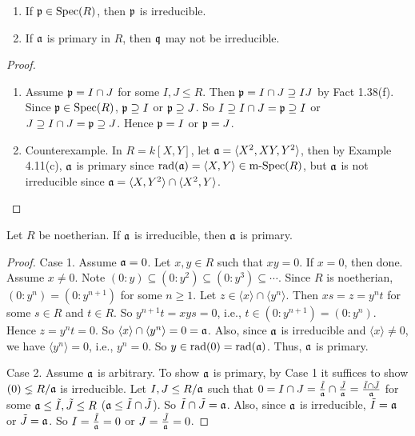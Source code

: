 \begin{example}
    \begin{enumerate}
        \item If $\mathfrak{p} \in \operatorname{Spec}(R)$, then $\mathfrak{p}$ is irreducible.
        \item If $\mathfrak{a}$ is primary in $R$, then $\mathfrak{q}$ may not be irreducible.
    \end{enumerate}
\end{example}

\begin{proof}
    \begin{enumerate}
        \item
            Assume $\mathfrak{p} = I \cap J$ for some $I,J \leq R$. Then $\mathfrak{p} = I \cap J \supseteq IJ$ by Fact 1.38(f). Since $\mathfrak{p} \in \operatorname{Spec}(R)$, $\mathfrak{p} \supseteq I$ or $\mathfrak{p} \supseteq J$. So $I \supseteq I \cap J = \mathfrak{p} \supseteq I$ or $J \supseteq I \cap J = \mathfrak{p} \supseteq J$. Hence $\mathfrak{p} = I$ or $\mathfrak{p} = J$. 
        \item 
            Counterexample. In $R = k[X,Y]$, let $\mathfrak{a} = \langle X^{2},XY,Y^{2} \rangle$, then by Example 4.11(c), $\mathfrak{a}$ is primary since $\operatorname{rad}(\mathfrak{a}) = \langle X,Y \rangle \in \operatorname{m-Spec}(R)$, but $\mathfrak{a}$ is not irreducible since $\mathfrak{a} = \langle X,Y^{2} \rangle \cap \langle X^{2},Y \rangle$. \qedhere
    \end{enumerate}
\end{proof}

\begin{proposition}
    Let $R$ be noetherian. If $\mathfrak{a}$ is irreducible, then $\mathfrak{a}$ is primary.
\end{proposition}

\begin{proof}
    Case 1. Assume $\mathfrak{a} = 0$. Let $x,y \in R$ such that $xy = 0$. If $x = 0$, then done. Assume $x \neq 0$. Note $(0:y) \subseteq (0:y^{2}) \subseteq (0:y^{3}) \subseteq \cdots$. Since $R$ is noetherian, $(0:y^{n}) = (0:y^{n+1})$ for some $n \geq 1$. Let $z \in \langle x \rangle \cap \langle y^{n} \rangle$. Then $xs = z = y^{n}t$ for some $s \in R$ and $t \in R$. So $y^{n+1}t = xys = 0$, i.e., $t \in (0:y^{n+1}) = (0:y^{n})$. Hence $z = y^{n}t = 0$. So $\langle x \rangle \cap \langle y^{n} \rangle = 0 = \mathfrak{a}$. Also, since $\mathfrak{a}$ is irreducible and $\langle x \rangle \neq 0$, we have $\langle y^{n} \rangle = 0$, i.e., $y^{n} = 0$. So $y \in \operatorname{rad}(0) = \operatorname{rad}(\mathfrak{a})$. Thus, $\mathfrak{a}$ is primary. \par 
    Case 2. Assume $\mathfrak{a}$ is arbitrary. To show $\mathfrak{a}$ is primary, by Case 1 it suffices to show $(0) \lneq R/\mathfrak{a}$ is irreducible. Let $I,J \leq R/\mathfrak{a}$ such that $0 = I \cap J = \frac{\tilde I}{\mathfrak{a}} \cap \frac{\tilde J}{\mathfrak{a}} = \frac{\tilde I \cap \tilde J}{\mathfrak{a}}$ for some $\mathfrak{a} \leq \tilde I,\tilde J \leq R$ ($\mathfrak{a} \leq \tilde I \cap \tilde J$). So $\tilde I \cap \tilde J = \mathfrak{a}$. Also, since $\mathfrak{a}$ is irreducible, $\tilde I = \mathfrak{a}$ or $\tilde J = \mathfrak{a}$. So $I = \frac{\tilde I}{\mathfrak{a}} = 0$ or $J = \frac{\tilde J}{\mathfrak{a}} = 0$. 
\end{proof}

